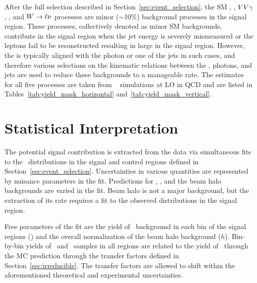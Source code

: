 After the full selection described in Section~\ref{sec:event_selection}, the SM \gj, \ttg, $VV\gamma$, \zllg, and ${W}\to\ell\nu$ processes are minor ($\sim$10\%) background processes in the signal region. 
These processes, collectively denoted as minor SM backgrounds, contribute in the signal region when the jet energy is severely mismeasured or the leptons fail to be reconstructed resulting in large \met in the signal region. 
However, the \met is typically aligned with the photon or one of the jets in such cases, and therefore various selections on the kinematic relations between the \met, photons, and jets are used to reduce these backgrounds to a manageable rate. 
The estimates for all five processes are taken from \MGvATNLO~\cite{} simulations at LO in QCD and are listed in Tables~\ref{tab:yield_mask_horizontal} and~\ref{tab:yield_mask_vertical}.

\section{Statistical Interpretation}
\label{sec:interpretation}

The potential signal contribution is extracted from the data via simultaneous fits to the
\ETg\ distributions in the signal and control regions defined in Section~\ref{sec:event_selection}. 
Uncertainties in various quantities are represented by nuisance parameters in the fit. 
Predictions for \zinvg, \wlng, and the beam halo backgrounds are varied in the fit. 
Beam halo is not a major background, but the extraction of its rate requires a fit to the observed distributions in the signal region.

Free parameters of the fit are the yield of \zinvg\ background in each bin of the signal regions (\NZg[i]) and the overall normalization of the beam halo background ($h$). 
Bin-by-bin yields of \wlng\ and \zllg\ samples in all regions are related to the yield of \zinvg\ through the MC prediction through the transfer factors defined in Section~\ref{sec:irreducible}. 
The transfer factors are allowed to shift within the aforementioned theoretical and experimental uncertainties.

